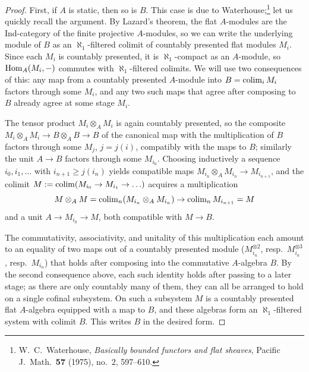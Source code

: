 \documentclass[11pt]{book}
\begin{document}
	\begin{proof}
		First, if $A$ is static, then so is $B$. This case is due to Waterhouse;\footnote{W.\ C.\ Waterhouse, \emph{Basically bounded functors and flat sheaves}, Pacific J.\ Math.\ \textbf{57} (1975), no.~2, 597--610.} let us quickly recall the argument. By Lazard's theorem, the flat $A$-modules are the Ind-category of the finite projective $A$-modules, so we can write the underlying module of $B$ as an $\aleph_1$-filtered colimit of countably presented flat modules $M_i$. Since each $M_i$ is countably presented, it is $\aleph_1$-compact as an $A$-module, so $\operatorname{Hom}_A(M_i, -)$ commutes with $\aleph_1$-filtered colimits. We will use two consequences of this: any map from a countably presented $A$-module into $B = \operatorname{colim}_i M_i$ factors through some $M_i$, and any two such maps that agree after composing to $B$ already agree at some stage $M_i$.

		The tensor product $M_i \otimes_A M_i$ is again countably presented, so the composite $M_i \otimes_A M_i \to B \otimes_A B \to B$ of the canonical map with the multiplication of $B$ factors through some $M_j$, $j = j(i)$, compatibly with the maps to $B$; similarly the unit $A \to B$ factors through some $M_{i_0}$. Choosing inductively a sequence $i_0, i_1, \ldots$ with $i_{n+1} \geq j(i_n)$ yields compatible maps $M_{i_n} \otimes_A M_{i_n} \to M_{i_{n+1}}$, and the colimit $M := \operatorname{colim}(M_{i_0} \to M_{i_1} \to \ldots)$ acquires a multiplication
		\[
			M \otimes_A M = \operatorname{colim}_n ( M_{i_n} \otimes_A M_{i_n} ) \to \operatorname{colim}_n M_{i_{n+1}} = M
		\]
		and a unit $A \to M_{i_0} \to M$, both compatible with $M \to B$.

		The commutativity, associativity, and unitality of this multiplication each amount to an equality of two maps out of a countably presented module ($M_{i_n}^{\otimes 2}$, resp.\ $M_{i_n}^{\otimes 3}$, resp.\ $M_{i_n}$) that holds after composing into the commutative $A$-algebra $B$. By the second consequence above, each such identity holds after passing to a later stage; as there are only countably many of them, they can all be arranged to hold on a single cofinal subsystem. On such a subsystem $M$ is a countably presented flat $A$-algebra equipped with a map to $B$, and these algebras form an $\aleph_1$-filtered system with colimit $B$. This writes $B$ in the desired form.


\end{proof}
\end{document}

